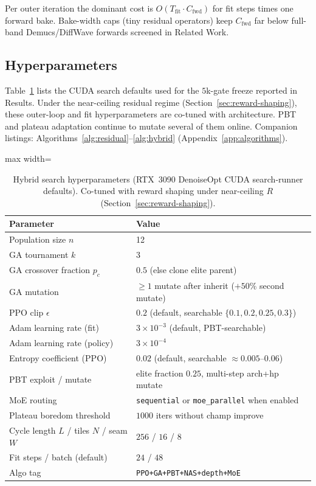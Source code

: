 \begin{remark}
\label{rem:complexity}
Per outer iteration the dominant cost is $O(T_{\mathrm{fit}}\cdot C_{\mathrm{fwd}})$ for fit steps times one forward bake.
Bake-width caps (tiny residual operators) keep $C_{\mathrm{fwd}}$ far below full-band Demucs/DiffWave forwards screened in Related Work.
\end{remark}

\subsection{Hyperparameters}
\label{sec:hyperparams}

Table~\ref{tab:hyperparams} lists the CUDA search defaults used for the $5$k-gate freeze reported in Results.
Under the near-ceiling residual regime (Section~\ref{sec:reward-shaping}), these outer-loop and fit hyperparameters are co-tuned with architecture. PBT and plateau adaptation continue to mutate several of them online.
Companion listings: Algorithms~\ref{alg:residual}--\ref{alg:hybrid} (Appendix~\ref{app:algorithms}).

\begin{table}[htbp]
  \centering
  \small
  \caption{Hybrid search hyperparameters (RTX~3090 DenoiseOpt CUDA search-runner defaults). Co-tuned with reward shaping under near-ceiling $R$ (Section~\ref{sec:reward-shaping}).}
  \label{tab:hyperparams}
  \setlength{\tabcolsep}{3pt}
  \begin{adjustbox}{max width=\columnwidth}
\begin{tabular}{@{}lp{}@{}}
    \toprule
    Parameter & Value \\
    \midrule
    Population size $n$ & 12 \\
    GA tournament $k$ & 3 \\
    GA crossover fraction $p_c$ & $0.5$ (else clone elite parent) \\
    GA mutation & $\ge 1$ mutate after inherit ($+50\%$ second mutate) \\
    PPO clip $\epsilon$ & $0.2$ (default, searchable $\{0.1,0.2,0.25,0.3\}$) \\
    Adam learning rate (fit) & $3{\times}10^{-3}$ (default, PBT-searchable) \\
    Adam learning rate (policy) & $3{\times}10^{-4}$ \\
    Entropy coefficient (PPO) & $0.02$ (default, searchable $\approx 0.005$--$0.06$) \\
    PBT exploit / mutate & elite fraction $0.25$, multi-step arch+hp mutate \\
    MoE routing & \texttt{sequential} or \texttt{moe\_parallel} when enabled \\
    Plateau boredom threshold & $1000$ iters without champ improve \\
    Cycle length $L$ / tiles $N$ / seam $W$ & $256$ / $16$ / $8$ \\
    Fit steps / batch (default) & $24$ / $48$ \\
    Algo tag & \texttt{PPO+GA+PBT+NAS+depth+MoE} \\
    \bottomrule
  \end{tabular}
\end{adjustbox}
\end{table}
